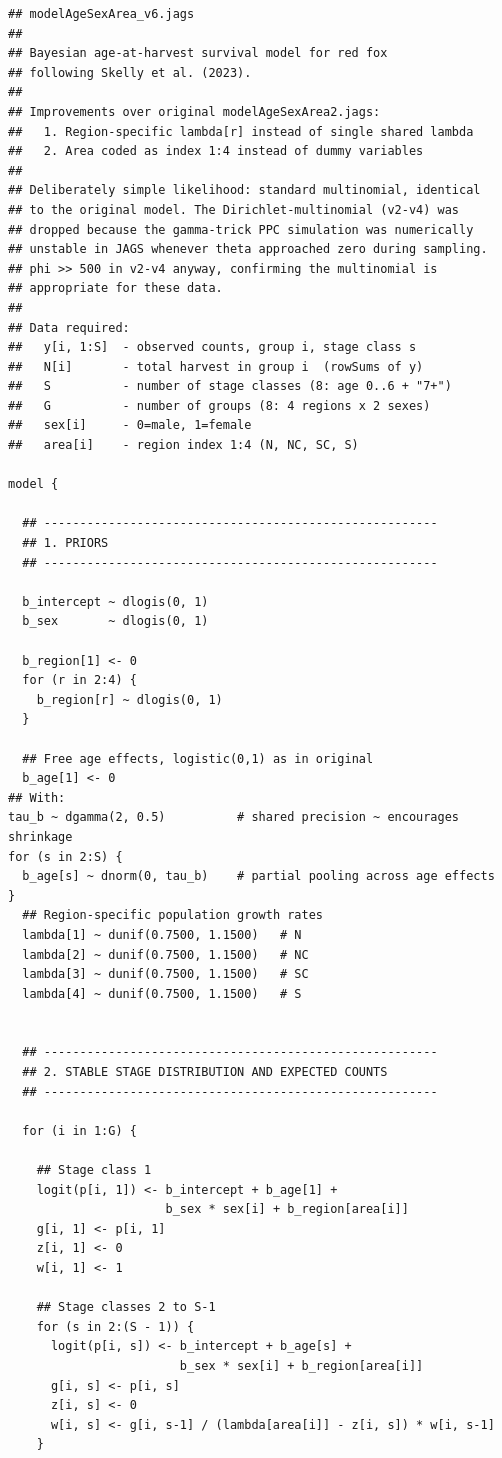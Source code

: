 \documentclass[12pt,a4paper,final,abstract=true,headings=small]{scrartcl}
\begin{document}
\begin{lstlisting}[language=JAGS]
## modelAgeSexArea_v6.jags
##
## Bayesian age-at-harvest survival model for red fox
## following Skelly et al. (2023).
##
## Improvements over original modelAgeSexArea2.jags:
##   1. Region-specific lambda[r] instead of single shared lambda
##   2. Area coded as index 1:4 instead of dummy variables
##
## Deliberately simple likelihood: standard multinomial, identical
## to the original model. The Dirichlet-multinomial (v2-v4) was
## dropped because the gamma-trick PPC simulation was numerically
## unstable in JAGS whenever theta approached zero during sampling.
## phi >> 500 in v2-v4 anyway, confirming the multinomial is
## appropriate for these data.
##
## Data required:
##   y[i, 1:S]  - observed counts, group i, stage class s
##   N[i]       - total harvest in group i  (rowSums of y)
##   S          - number of stage classes (8: age 0..6 + "7+")
##   G          - number of groups (8: 4 regions x 2 sexes)
##   sex[i]     - 0=male, 1=female
##   area[i]    - region index 1:4 (N, NC, SC, S)

model {

  ## -------------------------------------------------------
  ## 1. PRIORS
  ## -------------------------------------------------------

  b_intercept ~ dlogis(0, 1)
  b_sex       ~ dlogis(0, 1)

  b_region[1] <- 0
  for (r in 2:4) {
    b_region[r] ~ dlogis(0, 1)
  }

  ## Free age effects, logistic(0,1) as in original
  b_age[1] <- 0
## With:
tau_b ~ dgamma(2, 0.5)          # shared precision ~ encourages shrinkage
for (s in 2:S) {
  b_age[s] ~ dnorm(0, tau_b)    # partial pooling across age effects
}
  ## Region-specific population growth rates
  lambda[1] ~ dunif(0.7500, 1.1500)   # N
  lambda[2] ~ dunif(0.7500, 1.1500)   # NC
  lambda[3] ~ dunif(0.7500, 1.1500)   # SC
  lambda[4] ~ dunif(0.7500, 1.1500)   # S


  ## -------------------------------------------------------
  ## 2. STABLE STAGE DISTRIBUTION AND EXPECTED COUNTS
  ## -------------------------------------------------------

  for (i in 1:G) {

    ## Stage class 1
    logit(p[i, 1]) <- b_intercept + b_age[1] +
                      b_sex * sex[i] + b_region[area[i]]
    g[i, 1] <- p[i, 1]
    z[i, 1] <- 0
    w[i, 1] <- 1

    ## Stage classes 2 to S-1
    for (s in 2:(S - 1)) {
      logit(p[i, s]) <- b_intercept + b_age[s] +
                        b_sex * sex[i] + b_region[area[i]]
      g[i, s] <- p[i, s]
      z[i, s] <- 0
      w[i, s] <- g[i, s-1] / (lambda[area[i]] - z[i, s]) * w[i, s-1]
    }


\end{lstlisting}
\end{document}
